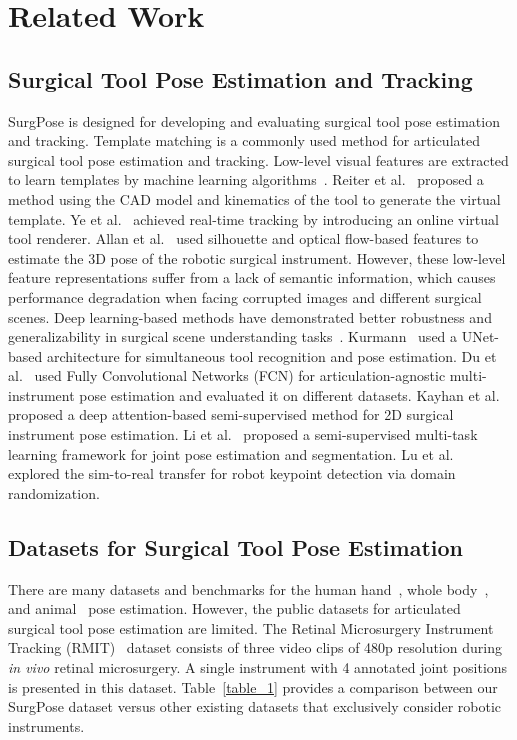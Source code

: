 \section{Related Work}
\subsection{Surgical Tool Pose Estimation and Tracking}
SurgPose is designed for developing and evaluating surgical tool pose estimation and tracking. Template matching is a commonly used method for articulated surgical tool pose estimation and tracking. Low-level visual features are extracted to learn templates by machine learning algorithms~\cite{reiter2014appearance}. Reiter et al.~\cite{reiter2012articulated} proposed a method using the CAD model and kinematics of the tool to generate the virtual template. Ye et al.~\cite{ye2016real} achieved real-time tracking by introducing an online virtual tool renderer. 
Allan et al.~\cite{allan20183} used silhouette and optical flow-based features to estimate the 3D pose of the robotic surgical instrument.
However, these low-level feature representations suffer from a lack of semantic information, which causes performance degradation when facing corrupted images and different surgical scenes.
Deep learning-based methods have demonstrated better robustness and generalizability in surgical scene understanding tasks~\cite{zhao2019real,wu2024real,schmidt2023sendd}. Kurmann~\cite{kurmann2017simultaneous} used a UNet-based architecture for simultaneous tool recognition and pose estimation. Du et al.~\cite{du2018articulated} used Fully Convolutional Networks (FCN) for articulation-agnostic multi-instrument pose estimation and evaluated it on different datasets. Kayhan et al.~\cite{kayhan2021deep} proposed a deep attention-based semi-supervised method for 2D surgical instrument pose estimation. Li et al.~\cite{li2022multi} proposed a semi-supervised multi-task learning framework for joint pose estimation and segmentation. Lu et al.~\cite{9714837} explored the sim-to-real transfer for robot keypoint detection via domain randomization.

\subsection{Datasets for Surgical Tool Pose Estimation}
There are many datasets and benchmarks for the human hand~\cite{hampali2022keypoint}, whole body~\cite{andriluka2018posetrack}, and animal~\cite{yang2022apt} pose estimation. However, the public datasets for articulated surgical tool pose estimation are limited. The Retinal Microsurgery Instrument Tracking (RMIT)~\cite{sznitman2012data} dataset consists of three video clips of 480p resolution during \textit{in vivo} retinal microsurgery. A single instrument with 4 annotated joint positions is presented in this dataset. Table~\ref{table_1} provides a comparison between our SurgPose dataset versus other existing datasets that exclusively consider robotic instruments.

